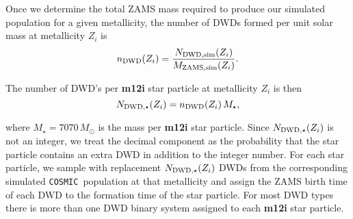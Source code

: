 \documentclass[twocolumn]{aastex631}
\newcommand\numberthis{\addtocounter{equation}{1}\tag{\theequation}}
\newcommand{\cosmic}{\texttt{COSMIC}}
\begin{document}


Once we determine the total ZAMS mass required to produce our simulated population for a given metallicity, the number of DWDs formed per unit solar mass at metallicity $Z_i$ is
\begin{equation}
    n_{\rm{DWD}}(Z_i) = \frac{N_{\rm{DWD, sim}}(Z_i)}{M_{\rm{ZAMS, sim}}(Z_i)}.
\end{equation}

\noindent The number of DWD’s per \textbf{m12i} star particle at metallicity $Z_i$ is then
\begin{equation}
    N_{\rm{DWD},\star} (Z_i) = n_{\rm{DWD}}(Z_i)\, M_\star,
\end{equation}


\noindent where $M_\star = 7070\,M_\odot$ is the mass per \textbf{m12i} star particle. Since $N_{\rm{DWD},\star} (Z_i)$ is not an integer, we treat the decimal component as the probability that the star particle contains an extra DWD in addition to the integer number. For each star particle, we sample with replacement $N_{\rm{DWD},\star}(Z_i)$ DWDs from the corresponding simulated \cosmic\ population at that metallicity and assign the ZAMS birth time of each DWD to the formation time of the star particle. For most DWD types there is more than one DWD binary system assigned to each \textbf{m12i} star particle. 
\end{document}

